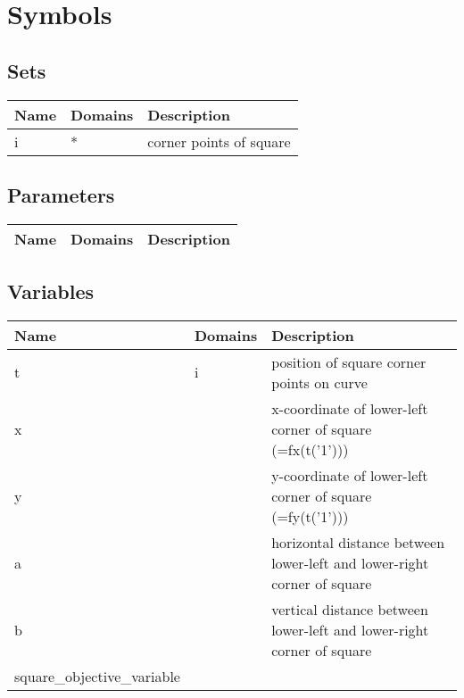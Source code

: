 \documentclass[11pt]{article}
\begin{document}
\section*{Symbols}


\subsection*{Sets}
\begin{tabularx}{\textwidth}{| l | l | X |}
\hline
\textbf{Name} & \textbf{Domains} & \textbf{Description}\\
\hline
\endhead

i & * & corner points of square\\
\hline
\end{tabularx}
\subsection*{Parameters}
\begin{tabularx}{\textwidth}{| l | l | X |}
\hline
\textbf{Name} & \textbf{Domains} & \textbf{Description}\\
\hline
\endhead

\hline
\end{tabularx}
\subsection*{Variables}
\begin{tabularx}{\textwidth}{| l | l | X |}
\hline
\textbf{Name} & \textbf{Domains} & \textbf{Description}\\
\hline
\endhead

t & i & position of square corner points on curve\\
x &  & x-coordinate of lower-left corner of square (=fx(t('1')))\\
y &  & y-coordinate of lower-left corner of square (=fy(t('1')))\\
a &  & horizontal distance between lower-left and lower-right corner of square\\
b &  & vertical distance between lower-left and lower-right corner of square\\
square\_objective\_variable &  & \\
\hline
\end{tabularx}
\end{document}
